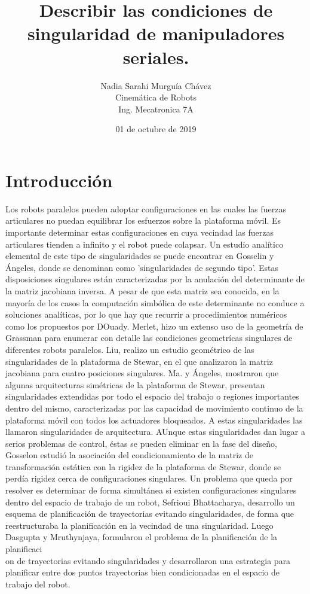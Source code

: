 \documentclass[letter,openright,12pt,spanish]{report}
\title{\textbf{Describir las condiciones de singularidad de manipuladores seriales.}}
\author{Nadia Sarahi Murgu\'ia Ch\'avez\\
		Cinem\'atica de Robots\\
		Ing. Mecatronica 7A}
\date{01 de octubre de 2019}
\begin{document}
\maketitle

\section{Introducci\'on}

Los robots paralelos pueden adoptar configuraciones en las cuales las fuerzas articulares no puedan equilibrar los esfuerzos sobre la plataforma m\'ovil. Es importante determinar estas configuraciones en cuya vecindad las fuerzas articulares tienden a infinito y el robot puede colapsar. Un estudio anal\'itico elemental de este tipo de singularidades se puede encontrar en Gosselin y \'Angeles, donde se denominan como 'singularidades de segundo tipo'. Estas disposiciones singulares est\'an caracterizadas por la anulaci\'on del determinante de la matriz jacobiana inversa. A pesar de que esta matriz sea conocida, en la mayor\'ia de los casos la computaci\'on simb\'olica de este determinante no conduce a soluciones anal\'iticas, por lo que hay que recurrir a procedimientos num\'ericos como los propuestos por DOuady. Merlet, hizo un extenso uso de la geometr\'ia de Grassman para enumerar con detalle las condiciones geometr\'icas singulares de diferentes robots paralelos. Liu, realizo un estudio geom\'etrico de las singularidades de la plataforma de Stewar, en el que analizaron la matriz jacobiana para cuatro posiciones singulares. Ma. y \'Angeles, mostraron que algunas arquitecturas sim\'etricas de la plataforma de Stewar, presentan singularidades extendidas por todo el espacio del trabajo o regiones importantes dentro del mismo, caracterizadas por las capacidad de movimiento continuo de la plataforma m\'ovil con todos los actuadores bloqueados. A estas singularidades las llamaron singularidades de arquitectura. AUnque estas singularidades dan lugar a serios problemas de control, \'estas se pueden eliminar en la fase del diseño, Gosselon estudi\'o la asociaci\'on del condicionamiento de la matriz de transformaci\'on est\'atica con la rigidez de la plataforma de Stewar, donde se perd\'ia rigidez cerca de configuraciones singulares. Un problema que queda por resolver es determinar de forma simult\'anea si existen configuraciones singulares  dentro del espacio de trabajo de un robot, Sefrioui Bhattacharya, desarrollo un esquema de planificaci\'on de trayectorias evitando singularidades, de forma que reestructuraba la planificaci\'on en la vecindad de una singularidad. Luego Dasgupta y Mruthynjaya, formularon el problema de la planificaci\'on de la planificaci\\on de trayectorias evitando singularidades y desarrollaron una estrategia para planificar entre dos puntos trayectorias bien condicionadas en el espacio de trabajo del robot.
\end{document}
